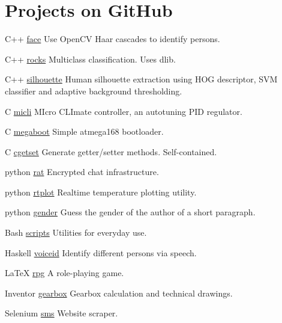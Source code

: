 \documentclass{tccv}
\begin{document}
\section{Projects on GitHub}
\begin{yearlist}
\item{C++}
     {\href{https://github.com/MiroslavVitkov/face}{face}}
     {Use OpenCV Haar cascades to identify persons. }

\item{C++}
     {\href{https://github.com/MiroslavVitkov/rocks}{rocks}}
     {Multiclass classification. Uses dlib.}

\item{C++}
     {\href{https://github.com/MiroslavVitkov/silhouette}{silhouette}}
     {Human silhouette extraction using HOG descriptor, SVM classifier and adaptive background thresholding.}

\item{C}
     {\href{https://github.com/MiroslavVitkov/micli}{micli}}
     {MIcro CLImate controller, an autotuning PID regulator.}

\item{C}
     {\href{https://github.com/MiroslavVitkov/megaboot}{megaboot}}
     {Simple atmega168 bootloader.}


\item{C}
     {\href{https://github.com/MiroslavVitkov/cgetset}{cgetset}}
     {Generate getter/setter methods. Self-contained.}

\item{python}
     {\href{https://github.com/MiroslavVitkov/rat}{rat}}
     {Encrypted chat infrastructure.}


\item{python}
     {\href{https://github.com/MiroslavVitkov/rtplot}{rtplot}}
     {Realtime temperature plotting utility.}


\item{python}
     {\href{https://github.com/MiroslavVitkov/gender}{gender}}
     {Guess the gender of the author of a short paragraph.}


\item{Bash}
     {\href{https://github.com/MiroslavVitkov/scripts}{scripts}}
     {Utilities for everyday use.}


\item{Haskell}
     {\href{https://github.com/MiroslavVitkov/voiceid}{voiceid}}
     {Identify different persons via speech.}


\item{LaTeX}
     {\href{https://github.com/MiroslavVitkov/rpg}{rpg}}
     {A role-playing game.}


\item{Inventor}
     {\href{https://github.com/MiroslavVitkov/gearbox}{gearbox}}
     {Gearbox calculation and technical drawings.}


\item{Selenium}
     {\href{https://github.com/MiroslavVitkov/sms}{sms}}
     {Website scraper.}
\end{yearlist}
\end{document}
